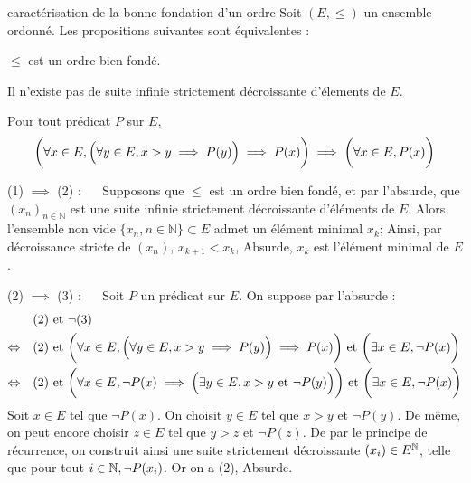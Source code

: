 


\begin{theoreme}{6.31}{caractérisation de la bonne fondation d'un ordre}
Soit $(E,\leq)$ un ensemble ordonné. Les propositions suivantes sont équivalentes : \begin{enumeratebf}
    \item $\leq$ est un ordre bien fondé.
    \item Il n'existe pas de suite infinie strictement décroissante d'élements de $E$.
    \item Pour tout prédicat $P$ sur $E$, $$\biggl(\forall x \in E, \Bigl(\forall y \in E, x>y \implies P(y)\Bigr) \implies P(x)\biggr) \implies \biggl(\forall x \in E, P(x)\biggr) $$
\end{enumeratebf}
\end{theoreme}


\begin{demonstration}
    (1) $\implies$ (2) : $\quad$ Supposons que $\leq$ est un ordre bien fondé, et par l'absurde, que $(x_n)_{n \in \mathbb{N}}$ est une suite infinie strictement décroissante d'éléments de $E$. Alors l'ensemble non vide $\{x_n, n\in \mathbb{N}\} \subset E$ admet un élément minimal $x_k$; Ainsi, par décroissance stricte de $(x_n)$, $x_{k+1} < x_k$, Absurde, $x_k$ est l'élément minimal de $E$.
\end{demonstration}

\begin{demonstration}
    (2) $\implies$ (3) : $\quad$ Soit $P$ un prédicat sur $E$. On suppose par l'absurde : \begin{align*}
        &\text{(2) et } \lnot \text{(3)} \\
        \Leftrightarrow \quad& \text{(2) et }  \biggl(\forall x \in E, \Bigl(\forall y \in E, x>y \implies P(y)\Bigr) \implies P(x)\biggr) \text{ et } \biggl(\exists x \in E, \lnot P(x)\biggr) \\
        \Leftrightarrow \quad& \text{(2) et }  \biggl(\forall x \in E,   \lnot P(x) \implies \Bigl(\exists y \in E, x>y \text{ et } \lnot P(y)\Bigr) \biggr) \text{ et } \biggl(\exists x \in E, \lnot P(x)\biggr)  \\
    \end{align*}
    Soit $x \in E$ tel que $\lnot P(x)$. On choisit $y \in E$ tel que $x>y$ et $\lnot P(y)$. De même, on peut encore choisir $z \in E$ tel que $y>z$ et $\lnot P(z)$. De par le principe de récurrence, on construit ainsi une suite strictement décroissante $(x_i) \in E^{\mathbb{N}}$, telle que pour tout $i \in \mathbb{N}, \lnot P(x_i)$. Or on a (2), Absurde.
\end{demonstration}

